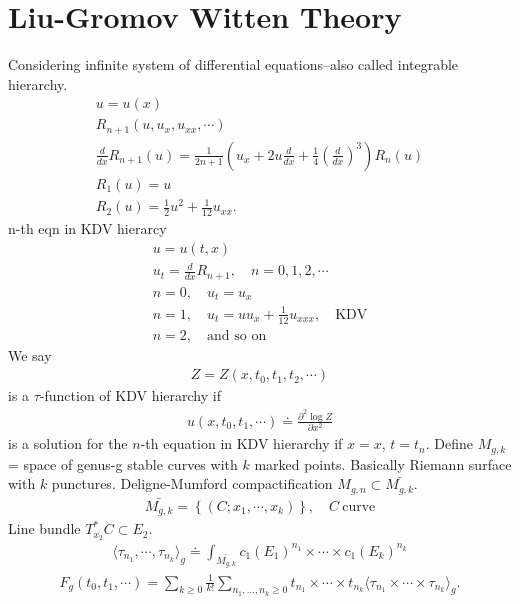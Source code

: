 \documentclass[12pt,reqno]{amsart}
\numberwithin{equation}{section}  %
\newcommand{\p}{\partial}
\begin{document}
\section{Liu-Gromov Witten Theory} 
\label{sec:liu}
Considering infinite system of differential equations--also called integrable
hierarchy. 
\begin{gather*}
     u = u(x)
    \\
    R_{n+1}(u, u_{x}, u_{xx}, \cdots)
    \\
    \frac{d}{dx} R_{n+1}(u) = \frac{1}{2n+1} \left( u_{x} + 2u \frac{d}{dx} +
    \frac{1}{4}\left( \frac{d}{dx} \right)^{3} \right) R_{n}(u)
    \\
    R_{1}(u) = u
    \\
    R_{2}(u) = \frac{1}{2} u^{2} + \frac{1}{12} u_{xx}.
\end{gather*}
n-th eqn in KDV hierarcy
%
%
\begin{gather*}
    u = u(t,x)
    \\
    u_{t} =  \frac{d}{dx}R_{n+1}, \quad n = 0,1,2,\cdots
    \\
    n = 0, \quad u_{t} = u_{x}
    \\
    n=1, \quad u_{t} = uu_{x} + \frac{1}{12}u_{xxx}, \quad \text{KDV}
    \\
    n=2, \quad \text{and so on}
\end{gather*}
We say
\begin{gather*}
  Z = Z(x, t_{0}, t_{1}, t_{2}, \cdots)
\end{gather*}
is a $\tau$-function of KDV hierarchy if
\begin{gather*}
  u(x, t_{0}, t_{1}, \cdots) \doteq \frac{\p^{2} \log Z}{\p x^{2}}
\end{gather*}
is a solution for the $n$-th equation in KDV hierarchy if $x =x$, $t =
t_{n}$. 
Define $M_{g,k}$ = space of genus-g stable curves with $k$ marked points.
Basically Riemann surface with $k$ punctures. Deligne-Mumford compactification $ M_{g,n} \subset \bar{M_{g,k}}$.
\begin{gather*}
  \bar{M_{g,k}} = \left\{ (C; x_{1}, \cdots, x_{k}) \right\}, \quad C \
  \text{curve} 
\end{gather*}
Line bundle $T_{x_{2}}^{*}C \subset E_{2}$.
\begin{gather*}
  \langle \tau_{n_{1}}, \cdots, \tau_{n_{k}} \rangle_{g} \doteq
  \int_{\bar{M_{g,k}}} c_{1}(E_{1})^{n_{1}} \times \cdots \times
  c_{1}(E_{k})^{n_{k}}
\end{gather*}
\begin{gather*}
  F_{g}(t_{0}, t_{1}, \cdots) = \sum_{k \ge 0} \frac{1}{k!} \sum_{n_{1}, \ldots,
  n_{k} \ge 0} t_{n_{1}} \times\cdots\times t_{n_{k}} \langle \tau_{n_{1}}
  \times\cdots \times \tau_{n_{k}} \rangle_{g}.
\end{gather*}
\end{document}
